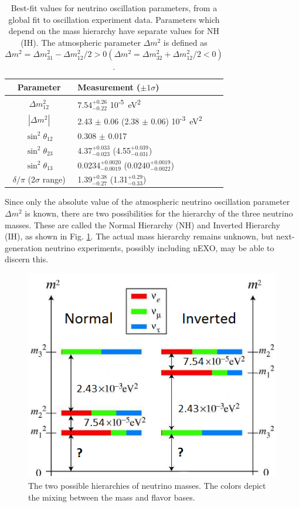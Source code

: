 \begin{table}[!htbp]
\caption{Best-fit values for neutrino oscillation parameters, from a global fit to oscillation experiment data.   Parameters which depend on the mass hierarchy have separate values for NH (IH).  The atmospheric parameter $\Delta m^{2}$ is defined as $\Delta m^{2} = \Delta m_{31}^{2} - \Delta m_{12}^{2}/2 > 0 (\Delta m^{2} = \Delta m_{32}^{2} + \Delta m_{12}^{2}/2 < 0)$. \cite{ReviewNuMass}} %
\label{table:nu_osc_vals}
\begin{tabular}{c|l}
Parameter & Measurement ($\pm 1 \sigma$) \\
\hline
$\Delta m_{12}^{2}$ & 7.54$^{+0.26}_{-0.22}$ 10\textsuperscript{-5}~eV\textsuperscript{2}\\
$|\Delta m^{2}|$ & 2.43 $\pm$ 0.06 (2.38 $\pm$ 0.06) 10\textsuperscript{-3}~eV\textsuperscript{2}\\
$\sin^{2} \theta_{12}$ & 0.308 $\pm$ 0.017\\
$\sin^{2} \theta_{23}$ & 4.37$^{+0.033}_{-0.023}$ (4.55$^{+0.039}_{-0.031}$)\\
$\sin^{2} \theta_{13}$ & 0.0234$^{+0.0020}_{-0.0019}$ (0.0240$^{+0.0019}_{-0.0022}$)\\
$\delta / \pi$ (2$\sigma$ range)& 1.39$^{+0.38}_{-0.27}$ (1.31$^{+0.29}_{-0.33}$)\\
\end{tabular}
\end{table}

Since only the absolute value of the atmospheric neutrino oscillation parameter $\Delta m^{2}$ is known, there are two possibilities for the hierarchy of the three neutrino masses.  These are called the Normal Hierarchy (NH) and Inverted Hierarchy (IH), as shown in Fig. \ref{fig:numasshier}.  The actual mass hierarchy remains unknown, but next-generation neutrino experiments, possibly including nEXO, may be able to discern this.

\begin{figure} %
        \centering
                \includegraphics[width=.5\textwidth]{figures/hierarchy_alterred.png}
                \caption{The two possible hierarchies of neutrino masses.  The colors depict the mixing between the mass and flavor bases.}
\label{fig:numasshier}
\end{figure}


